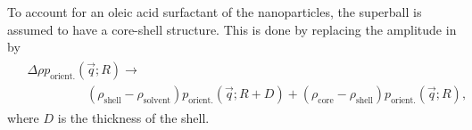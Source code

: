 \documentclass[\main/dresen_thesis.tex]{subfiles}
\begin{document}
    To account for an oleic acid surfactant of the nanoparticles, the superball is assumed to have a core-shell structure.
    This is done by replacing the amplitude in  by
    \begin{align}
      \begin{split}
        &\Delta \rho p_\mathrm{orient.}(\vec{q}; R) \rightarrow\\
        &\hspace{2cm}(\rho_\mathrm{shell} - \rho_\mathrm{solvent}) p_\mathrm{orient.}(\vec{q}; R+D) + (\rho_\mathrm{core} - \rho_\mathrm{shell}) p_\mathrm{orient.}(\vec{q}; R),
      \end{split}
    \end{align}
    where $D$ is the thickness of the shell.
\end{document}
